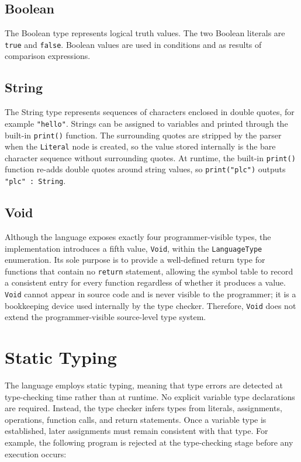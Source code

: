 \subsection{Boolean}
The Boolean type represents logical truth values. The two Boolean literals are
\texttt{true} and \texttt{false}. Boolean values are used in conditions and as
results of comparison expressions.

\subsection{String}
The String type represents sequences of characters enclosed in double quotes,
for example \texttt{"hello"}. Strings can be assigned to variables and printed
through the built-in \texttt{print()} function. The surrounding quotes are
stripped by the parser when the \texttt{Literal} node is created, so the value
stored internally is the bare character sequence without surrounding quotes. At
runtime, the built-in \texttt{print()} function re-adds double quotes around
string values, so \texttt{print("plc")} outputs \texttt{"plc" : String}.

\subsection{Void}
Although the language exposes exactly four programmer-visible types, the
implementation introduces a fifth value, \texttt{Void}, within the
\texttt{LanguageType} enumeration. Its sole purpose is to provide a
well-defined return type for functions that contain no \texttt{return}
statement, allowing the symbol table to record a consistent entry for every
function regardless of whether it produces a value. \texttt{Void} cannot appear
in source code and is never visible to the programmer; it is a bookkeeping
device used internally by the type checker. Therefore, \texttt{Void} does not
extend the programmer-visible source-level type system.

\section{Static Typing}
The language employs static typing, meaning that type errors are detected at
type-checking time rather than at runtime. No explicit variable type
declarations are required. Instead, the type checker infers types from literals,
assignments, operations, function calls, and return statements. Once a variable
type is established, later assignments must remain consistent with that type.
For example, the following program is rejected at the type-checking stage before
any execution occurs:

